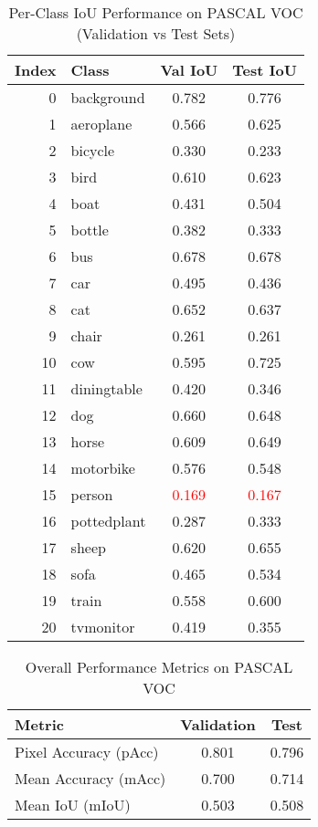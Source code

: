 \begin{table}[th]
\centering
\caption{Per-Class IoU Performance on PASCAL VOC (Validation vs Test Sets)}
\begin{tabular}{r l c c}
\hline
\textbf{Index} & \textbf{Class} & \textbf{Val IoU} & \textbf{Test IoU} \\ \hline
0  & background   & 0.782 & 0.776 \\
1  & aeroplane    & 0.566 & 0.625 \\
2  & bicycle      & 0.330 & 0.233 \\
3  & bird         & 0.610 & 0.623 \\
4  & boat         & 0.431 & 0.504 \\
5  & bottle       & 0.382 & 0.333 \\
6  & bus          & 0.678 & 0.678 \\
7  & car          & 0.495 & 0.436 \\
8  & cat          & 0.652 & 0.637 \\
9  & chair        & 0.261 & 0.261 \\
10 & cow          & 0.595 & 0.725 \\
11 & diningtable  & 0.420 & 0.346 \\
12 & dog          & 0.660 & 0.648 \\
13 & horse        & 0.609 & 0.649 \\
14 & motorbike    & 0.576 & 0.548 \\
15 & person       & \textcolor{red}{0.169} & \textcolor{red}{0.167} \\
16 & pottedplant  & 0.287 & 0.333 \\
17 & sheep        & 0.620 & 0.655 \\
18 & sofa         & 0.465 & 0.534 \\
19 & train        & 0.558 & 0.600 \\
20 & tvmonitor    & 0.419 & 0.355 \\ \hline
\end{tabular}
\label{tab:per_class_iou_comparison}
\end{table}

\begin{table}[ht]
\centering
\caption{Overall Performance Metrics on PASCAL VOC}
\begin{tabular}{l c c}
\hline
\textbf{Metric} & \textbf{Validation} & \textbf{Test} \\ \hline
Pixel Accuracy (pAcc) & 0.801 & 0.796 \\
Mean Accuracy (mAcc)  & 0.700 & 0.714 \\
Mean IoU (mIoU)       & 0.503 & 0.508 \\ \hline
\end{tabular}
\label{tab:summarized_results}
\end{table}


